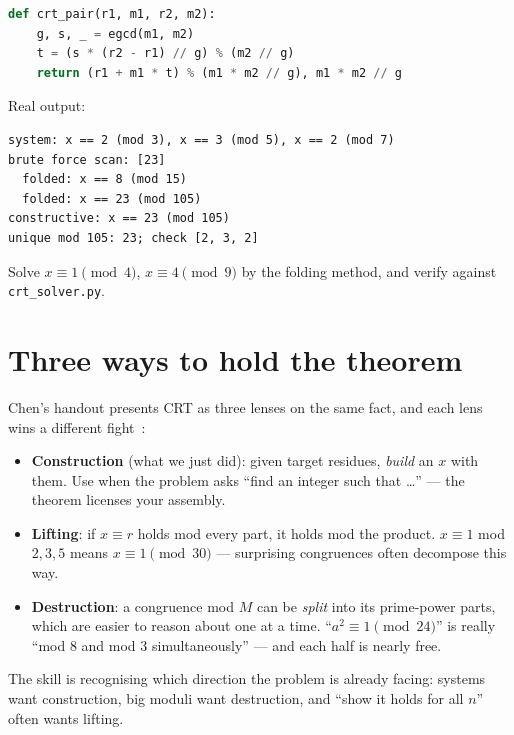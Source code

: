 \begin{lstlisting}[language=Python,caption={\texttt{crt\_solver.py}: fold
two congruences at a time via B\'ezout (full script in
\texttt{code/crt\_solver.py}).},label={lst:crt}]
def crt_pair(r1, m1, r2, m2):
    g, s, _ = egcd(m1, m2)
    t = (s * (r2 - r1) // g) % (m2 // g)
    return (r1 + m1 * t) % (m1 * m2 // g), m1 * m2 // g
\end{lstlisting}
Real output:
\begin{lstlisting}[numbers=none]
system: x == 2 (mod 3), x == 3 (mod 5), x == 2 (mod 7)
brute force scan: [23]
  folded: x == 8 (mod 15)
  folded: x == 23 (mod 105)
constructive: x == 23 (mod 105)
unique mod 105: 23; check [2, 3, 2]
\end{lstlisting}

\begin{exercise}[easy]\label{exr:crt2}
Solve $x \equiv 1 \pmod 4$, $x \equiv 4 \pmod 9$ by the folding method,
and verify against \texttt{crt\_solver.py}.
\end{exercise}

\section{Three ways to hold the theorem}\label{sec:lenses}

Chen's handout presents CRT as three lenses on the same fact, and each
lens wins a different fight~\cite{chen-crt}:
\begin{itemize}
\item \textbf{Construction} (what we just did): given target residues,
\emph{build} an $x$ with them. Use when the problem asks ``find an
integer such that \dots'' --- the theorem licenses your assembly.
\item \textbf{Lifting}: if $x \equiv r$ holds mod every part, it holds
mod the product. $x \equiv 1$ mod $2,3,5$ means $x \equiv 1 \pmod{30}$ ---
surprising congruences often decompose this way.
\item \textbf{Destruction}: a congruence mod $M$ can be \emph{split} into
its prime-power parts, which are easier to reason about one at a time.
``$a^2 \equiv 1 \pmod{24}$'' is really ``mod $8$ and mod $3$
simultaneously'' --- and each half is nearly free.
\end{itemize}
The skill is recognising which direction the problem is already facing:
systems want construction, big moduli want destruction, and ``show it
holds for all $n$'' often wants lifting.

